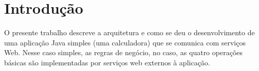 %


\chapter{Introdução}

O presente trabalho descreve a arquitetura e como se deu o desenvolvimento de
uma aplicação Java simples (uma calculadora) que se comunica com serviços Web.
Nesse caso simples, as regras de negócio, no caso, as quatro operações básicas
são implementadas por serviços web externos à aplicação.
